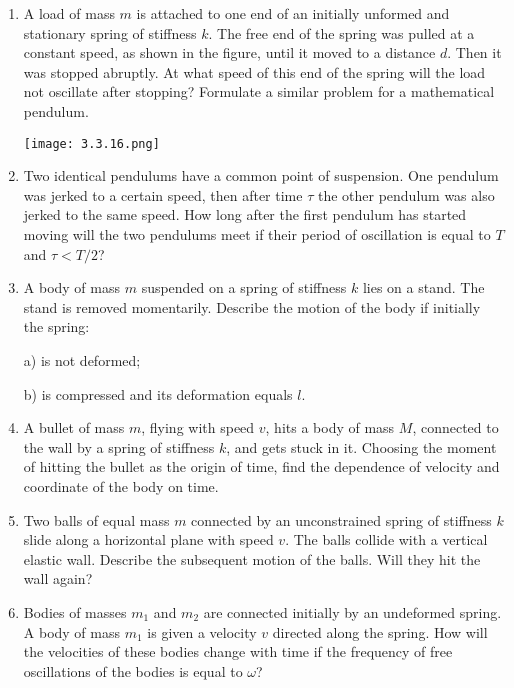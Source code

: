 \documentclass{article}
\begin{document}
\begin{enumerate}[label=3.3.\arabic*]
\item A load of mass $m$ is attached to one end of an initially unformed and stationary spring of stiffness $k$. The free end of the spring was pulled at a constant speed, as shown in the figure, until it moved to a distance $d$. Then it was stopped abruptly. At what speed of this end of the spring will the load not oscillate after stopping? Formulate a similar problem for a mathematical pendulum.

\begin{center}
    \texttt{[image: 3.3.16.png]}
\end{center}


\item Two identical pendulums have a common point of suspension. One pendulum was jerked to a certain speed, then after time $\tau$ the other pendulum was also jerked to the same speed. How long after the first pendulum has started moving will the two pendulums meet if their period of oscillation is equal to $T$ and $\tau < T/2$?



\item A body of mass $m$ suspended on a spring of stiffness $k$ lies on a stand. The stand is removed momentarily. Describe the motion of the body if initially the spring: 

a) is not deformed; 

b) is compressed and its deformation equals $l$.

\item A bullet of mass $m$, flying with speed $v$, hits a body of mass $M$, connected to the wall by a spring of stiffness $k$, and gets stuck in it. Choosing the moment of hitting the bullet as the origin of time, find the dependence of velocity and coordinate of the body on time.

\item Two balls of equal mass $m$ connected by an unconstrained spring of stiffness $k$ slide along a horizontal plane with speed $v$. The balls collide with a vertical elastic wall. Describe the subsequent motion of the balls. Will they hit the wall again?

\item Bodies of masses $m_1$ and $m_2$ are connected initially by an undeformed spring. A body of mass $m_1$ is given a velocity $v$ directed along the spring. How will the velocities of these bodies change with time if the frequency of free oscillations of the bodies is equal to $\omega$?


\end{enumerate}
\end{document}

